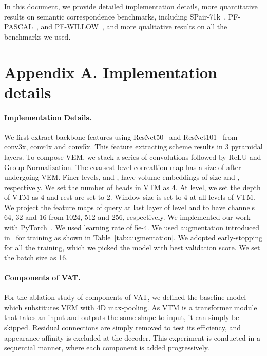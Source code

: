 
In this document, we provide detailed implementation details, more quantitative results on semantic correspondence benchmarks, including SPair-71k~\cite{min2019spair}, PF-PASCAL~\cite{ham2017proposal}, and PF-WILLOW~\cite{ham2016proposal}, and more qualitative results on all the benchmarks we used.

\section*{Appendix A. Implementation details}
\paragraph{Implementation Details.}
We first extract backbone features using ResNet50~\cite{he2016deep} and ResNet101~\cite{he2016deep} from conv3x, conv4x and conv5x. This feature extracting scheme results in 3 pyramidal layers. To compose VEM, we stack a series of  convolutions followed by ReLU and Group Normalization. The coarsest level correaltion map has a size of  after undergoing VEM. Finer levels,  and , have volume embeddings of size  and , respectively. We set the number of heads in VTM as 4. At  level, we set the depth of VTM as 4 and rest are set to 2. Window size  is set to 4 at all levels of VTM. We project the feature maps of query at last layer of level  and  to have channels 64, 32 and 16 from 1024, 512 and 256, respectively. We implemented our work with PyTorch~\cite{paszke2017automatic}. We used learning rate of 5e-4. We used augmentation introduced in~\cite{buslaev2020albumentations} for training as shown in Table~\ref{tab:augmentation}. We adopted early-stopping for all the training, which we picked the model with best validation score. We set the batch size as 16.
\vspace{-10pt}

\paragraph{Components of VAT.}
For the ablation study of components of VAT, we defined the baseline model which substitutes VEM with 4D max-pooling. As VTM is a transformer module that takes an input and outputs the same shape to input, it can simply be skipped. Residual connections are simply removed to test its efficiency, and appearance affinity is excluded at the decoder. This experiment is conducted in a sequential manner, where each component is added progressively. 
\vspace{-10pt}

